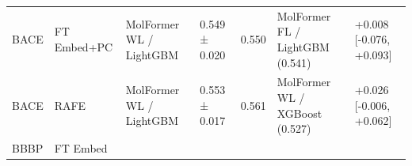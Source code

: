 \documentclass[
  10pt,
]{article}
\begin{document}
\begin{longtable}[]{@{}lllllll@{}}
\begin{minipage}[t]{0.12\columnwidth}
BACE\strut
\end{minipage} & \begin{minipage}[t]{0.12\columnwidth}\raggedright
FT Embed+PC\strut
\end{minipage} & \begin{minipage}[t]{0.12\columnwidth}\raggedright
MolFormer WL / LightGBM\strut
\end{minipage} & \begin{minipage}[t]{0.12\columnwidth}\raggedright
0.549 ± 0.020\strut
\end{minipage} & \begin{minipage}[t]{0.12\columnwidth}\raggedright
0.550\strut
\end{minipage} & \begin{minipage}[t]{0.12\columnwidth}\raggedright
MolFormer FL / LightGBM (0.541)\strut
\end{minipage} & \begin{minipage}[t]{0.12\columnwidth}\raggedright
+0.008 {[}-0.076, +0.093{]}\strut
\end{minipage}\tabularnewline
\begin{minipage}[t]{0.12\columnwidth}\raggedright
BACE\strut
\end{minipage} & \begin{minipage}[t]{0.12\columnwidth}\raggedright
RAFE\strut
\end{minipage} & \begin{minipage}[t]{0.12\columnwidth}\raggedright
MolFormer WL / LightGBM\strut
\end{minipage} & \begin{minipage}[t]{0.12\columnwidth}\raggedright
0.553 ± 0.017\strut
\end{minipage} & \begin{minipage}[t]{0.12\columnwidth}\raggedright
0.561\strut
\end{minipage} & \begin{minipage}[t]{0.12\columnwidth}\raggedright
MolFormer WL / XGBoost (0.527)\strut
\end{minipage} & \begin{minipage}[t]{0.12\columnwidth}\raggedright
+0.026 {[}-0.006, +0.062{]}\strut
\end{minipage}\tabularnewline
\begin{minipage}[t]{0.12\columnwidth}\raggedright
BBBP\strut
\end{minipage} & \begin{minipage}[t]{0.12\columnwidth}\raggedright
FT Embed\strut
\end{minipage} & \begin{minipage}[t]{0.12\columnwidth}\raggedright

\end{minipage}
\end{longtable}
\end{document}
